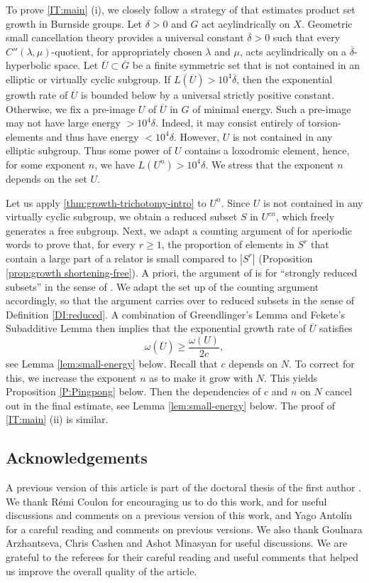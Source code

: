 \documentclass[leqno,a4paper,10pt]{amsart}
\theoremstyle{plain}
\theoremstyle{definition}
\theoremstyle{remark}
\newcommand{\q}[1]{\overline{#1}}
\let\ge\geqslant
\begin{document}
To prove \autoref{IT:main} (i), we closely follow a strategy of \cite{coulon_product_2022} that estimates product set growth in Burnside groups. Let $\delta>0$ and $G$ act acylindrically on $X$.  Geometric small cancellation theory provides a universal constant $\q \delta>0$ such that every $C''(\lambda,\mu)$-quotient, for appropriately chosen $\lambda$ and $\mu$, acts acylindrically on a $\q \delta$-hyperbolic space. Let $\q U\subset \q G$ be a finite symmetric set that is not contained in an elliptic or virtually cyclic subgroup. If $L(\q U)>10^4 \q \delta$, then the exponential growth rate of $\q{U}$ is bounded below by a universal strictly positive constant.  Otherwise, we fix a pre-image $U$ of $\q{U}$ in $G$ of minimal energy. Such a pre-image may not have large energy $>10^4\delta$. Indeed, it may consist entirely of torsion-elements and thus have energy $<10^4\delta$. However, $U$ is not contained in any elliptic subgroup.  Thus some power of $U$ contains a loxodromic element, hence, for some exponent $n$, we have $L(U^{n})>10^4\delta$. We stress that the exponent $n$ depends on the set $U$.

Let us apply \autoref{thm:growth-trichotomy-intro} to $U^{n}$. Since $U$ is not contained in any virtually cyclic subgroup, we obtain a reduced subset $S$ in $U^{cn}$, which freely generates a free subgroup. Next, we adapt a counting argument of \cite{coulon_growth_2013,coulon_product_2022} for aperiodic words to prove that, for every $r\ge 1$, the proportion of elements in $S^r$ that contain a large part of a relator is small compared to $|S^r|$ (Proposition \ref{prop:growth shortening-free}). A priori, the argument of \cite{coulon_product_2022} is for ``strongly reduced subsets'' in the sense of \cite[Definition 3.1]{coulon_product_2022}. We adapt the set up of the counting argument accordingly, so that the argument carries over to reduced subsets in the sense of Definition \ref{DI:reduced}. A combination of {Greendlinger's Lemma} and {Fekete's Subadditive Lemma} then implies that the exponential growth rate of $\q{U}$ satisfies
$$\omega(\q U)\ge \frac{ \omega(U)}{2c},$$ see Lemma \ref{lem:small-energy} below.  
Recall that $c$ depends on $N$. 
To correct for this, we  increase the exponent $n$ as to make it grow with $N$. This yields Proposition \ref{P:Pingpong} below. Then the dependencies of $c$ and $n$ on $N$ cancel out in the final estimate, see Lemma \ref{lem:small-energy} below. The proof of \autoref{IT:main} (ii) is similar.


\subsection{Acknowledgements}
A previous version of this article is part of the doctoral thesis of the first author \cite{legaspijuanatey:tel-04251309}. 
We thank Rémi Coulon for encouraging us to do this work, and for useful discussions and comments on a previous version of this work, and Yago Antolín for a careful reading and comments on previous versions. We also thank Goulnara Arzhantseva, Chris Cashen and Ashot Minasyan for useful discussions. We are grateful to the referees for their careful reading and useful comments that helped us improve the overall quality of the article. 
\end{document}
